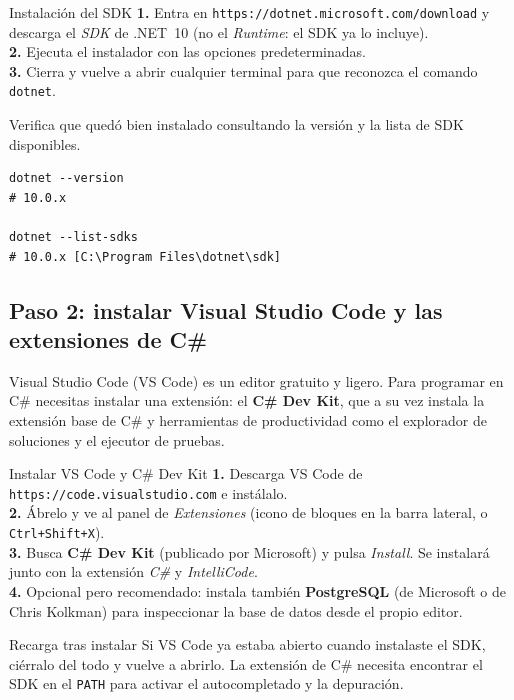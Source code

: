 \documentclass[11pt]{article}
\begin{document}
\begin{cajavscode}{Instalación del SDK}
\textbf{1.} Entra en \texttt{https://dotnet.microsoft.com/download} y descarga el \emph{SDK} de .NET~10 (no el \emph{Runtime}: el SDK ya lo incluye).\\
\textbf{2.} Ejecuta el instalador con las opciones predeterminadas.\\
\textbf{3.} Cierra y vuelve a abrir cualquier terminal para que reconozca el comando \texttt{dotnet}.
\end{cajavscode}
\vspace{2pt}
Verifica que quedó bien instalado consultando la versión y la lista de SDK disponibles.

\begin{cajacodigo}
\begin{lstlisting}[style=shell]
dotnet --version
# 10.0.x

dotnet --list-sdks
# 10.0.x [C:\Program Files\dotnet\sdk]
\end{lstlisting}
\end{cajacodigo}

\subsection{Paso 2: instalar Visual Studio Code y las extensiones de C\#}
Visual Studio Code (VS Code) es un editor gratuito y ligero. Para programar en C\# necesitas instalar una extensión: el \textbf{C\# Dev Kit}, que a su vez instala la extensión base de C\# y herramientas de productividad como el explorador de soluciones y el ejecutor de pruebas.

\begin{cajavscode}{Instalar VS Code y C\# Dev Kit}
\textbf{1.} Descarga VS Code de \texttt{https://code.visualstudio.com} e instálalo.\\
\textbf{2.} Ábrelo y ve al panel de \emph{Extensiones} (icono de bloques en la barra lateral, o \texttt{Ctrl+Shift+X}).\\
\textbf{3.} Busca \textbf{C\# Dev Kit} (publicado por Microsoft) y pulsa \emph{Install}. Se instalará junto con la extensión \emph{C\#} y \emph{IntelliCode}.\\
\textbf{4.} Opcional pero recomendado: instala también \textbf{PostgreSQL} (de Microsoft o de Chris Kolkman) para inspeccionar la base de datos desde el propio editor.
\end{cajavscode}
\vspace{2pt}
\begin{cajatip}{Recarga tras instalar}
Si VS Code ya estaba abierto cuando instalaste el SDK, ciérralo del todo y vuelve a abrirlo. La extensión de C\# necesita encontrar el SDK en el \texttt{PATH} para activar el autocompletado y la depuración.\par
\end{cajatip}
\end{document}
